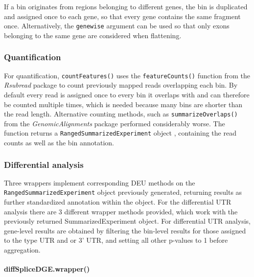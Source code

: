 \documentclass{bmcart}
\begin{document}
If a bin originates from regions belonging to different genes, the bin is duplicated and assigned once to each gene, so that every gene contains the same fragment once. Alternatively, the \texttt{genewise} argument can be used so that only exons belonging to the same gene are considered when flattening.

\subsubsection{Quantification}

For quantification, \texttt{countFeatures()} uses the \texttt{featureCounts()} function from the \textit{Rsubread} package \cite{Liao2014FeatureCounts:Features} to count previously mapped reads overlapping each bin. By default every read is assigned once to every bin it overlaps with and can therefore be counted multiple times, which is needed because many bins are shorter than the read length. Alternative counting methods, such as \texttt{summarizeOverlaps()} from the \textit{GenomicAlignments} package \cite{Lawrence2013SoftwareRanges} performed considerably worse. The function returns a \texttt{RangedSummarizedExperiment} object \cite{Morgan2018SummarizedExperiment:Container}, containing the read counts as well as the bin annotation. 

\subsubsection{Differential analysis}
\label{sec:DE}
Three wrappers implement corresponding DEU methods on the \texttt{RangedSummarizedExperiment} object previously generated, returning results as further standardized annotation within the object. For the differential UTR analysis there are 3 different wrapper methods provided, which work with the previously returned SummarizedExperiment object. For differential UTR analysis, gene-level results are obtained by filtering the bin-level results for those assigned to the type UTR and or 3' UTR, and setting all other p-values to 1 before aggregation.

\paragraph{diffSpliceDGE.wrapper()}
\end{document}

